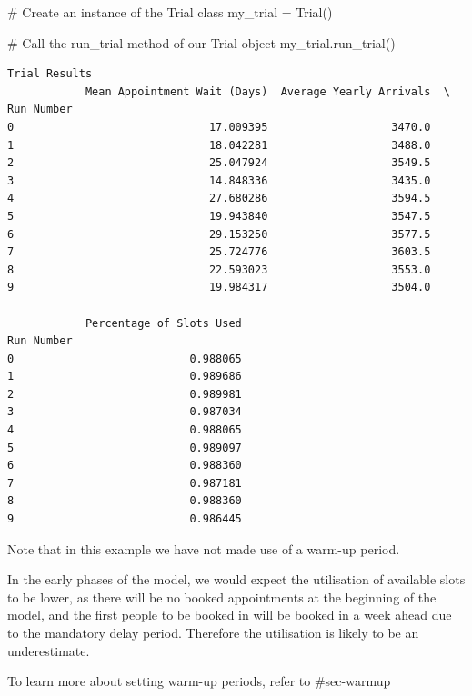 \documentclass[
  letterpaper,
  DIV=11,
  numbers=noendperiod]{scrreprt}
\newenvironment{Shaded}{}{}
\newcommand{\CommentTok}[1]{\textcolor[rgb]{0.42,0.45,0.49}{#1}}
\newcommand{\NormalTok}[1]{\textcolor[rgb]{0.14,0.16,0.18}{#1}}
\newcommand{\OperatorTok}[1]{\textcolor[rgb]{0.14,0.16,0.18}{#1}}
\begin{document}
\begin{Shaded}
\begin{Highlighting}[]
\CommentTok{\# Create an instance of the Trial class}
\NormalTok{my\_trial }\OperatorTok{=}\NormalTok{ Trial()}

\CommentTok{\# Call the run\_trial method of our Trial object}
\NormalTok{my\_trial.run\_trial()}
\end{Highlighting}
\end{Shaded}

\begin{verbatim}
Trial Results
            Mean Appointment Wait (Days)  Average Yearly Arrivals  \
Run Number                                                          
0                              17.009395                   3470.0   
1                              18.042281                   3488.0   
2                              25.047924                   3549.5   
3                              14.848336                   3435.0   
4                              27.680286                   3594.5   
5                              19.943840                   3547.5   
6                              29.153250                   3577.5   
7                              25.724776                   3603.5   
8                              22.593023                   3553.0   
9                              19.984317                   3504.0   

            Percentage of Slots Used  
Run Number                            
0                           0.988065  
1                           0.989686  
2                           0.989981  
3                           0.987034  
4                           0.988065  
5                           0.989097  
6                           0.988360  
7                           0.987181  
8                           0.988360  
9                           0.986445  
\end{verbatim}

\begin{tcolorbox}[enhanced jigsaw, colframe=quarto-callout-important-color-frame, bottomtitle=1mm, breakable, rightrule=.15mm, coltitle=black, colbacktitle=quarto-callout-important-color!10!white, opacityback=0, leftrule=.75mm, arc=.35mm, toptitle=1mm, title=\textcolor{quarto-callout-important-color}{\faExclamation}\hspace{0.5em}{Important}, titlerule=0mm, colback=white, toprule=.15mm, bottomrule=.15mm, left=2mm, opacitybacktitle=0.6]

Note that in this example we have not made use of a warm-up period.

In the early phases of the model, we would expect the utilisation of
available slots to be lower, as there will be no booked appointments at
the beginning of the model, and the first people to be booked in will be
booked in a week ahead due to the mandatory delay period. Therefore the
utilisation is likely to be an underestimate.

To learn more about setting warm-up periods, refer to \#sec-warmup

\end{tcolorbox}
\end{document}
